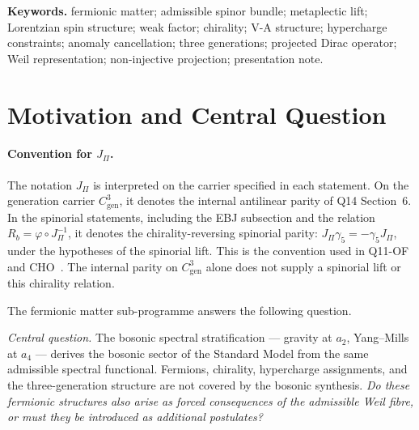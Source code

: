 \documentclass[11pt,a4paper]{article}
\theoremstyle{definition}
\newcommand{\Cgen}{C^3_{\mathrm{gen}}}
\begin{document}
  \medskip
  \noindent\textbf{Keywords.}
  fermionic matter; admissible spinor bundle; metaplectic lift; Lorentzian spin structure; weak factor;
  chirality; V-A structure; hypercharge constraints; anomaly cancellation; three generations;
  projected Dirac operator; Weil representation; non-injective projection; presentation note.

  \newpage
  \tableofcontents

  \newpage

  \section{Motivation and Central Question}
    \label{sec:motivation}

    \paragraph{Convention for \texorpdfstring{$J_\Pi$}{J-Pi}.}
    The notation $J_\Pi$ is interpreted on the carrier specified in each statement.
    On the generation carrier $\Cgen$, it denotes the internal antilinear parity of Q14 Section~6.
    In the spinorial statements, including the EBJ subsection and the relation
    $R_b=\varphi\circ J_\Pi^{-1}$, it denotes the chirality-reversing spinorial parity:
    $J_\Pi\gamma_5=-\gamma_5J_\Pi$, under the hypotheses of the spinorial lift.
    This is the convention used in Q11-OF and CHO~\cite{Beau2026q11of, Beau2026cho}.
    The internal parity on $\Cgen$ alone does not supply a spinorial lift or this chirality relation.

    The fermionic matter sub-programme answers the following question.

    \medskip
    \noindent\textit{Central question.}
    The bosonic spectral stratification --- gravity at $a_2$, Yang--Mills at $a_4$ --- derives
    the bosonic sector of the Standard Model from the same admissible spectral functional.
    Fermions, chirality, hypercharge assignments, and the three-generation structure are not
    covered by the bosonic synthesis.
    \textit{Do these fermionic structures also arise as forced consequences of the admissible
    Weil fibre, or must they be introduced as additional postulates?}
\end{document}
